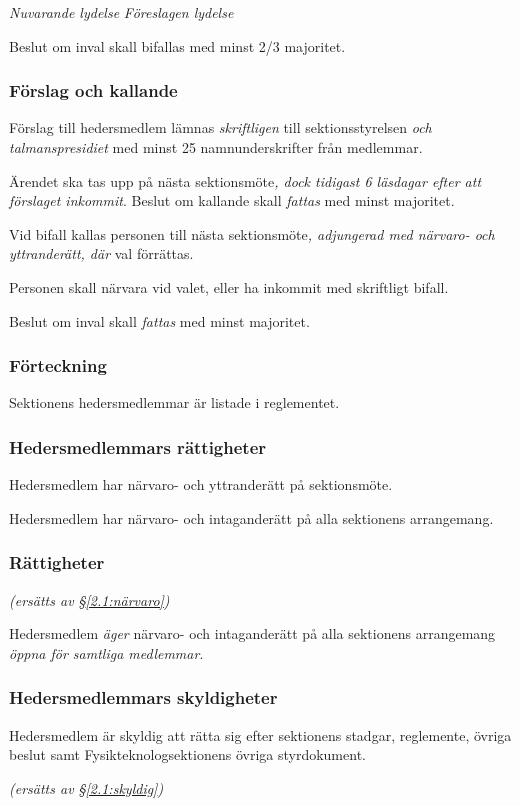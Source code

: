 \documentclass{article}
\newenvironment{lydelse}
    {\begin{paracol}{2}%
        \emph{Nuvarande lydelse}%
        \switchcolumn%
        \emph{Föreslagen lydelse}%
    \end{paracol}%
    \begin{enumerate}[label=\thesubsection.\arabic*]%
    \begin{paracol}{2}%
    }{\end{paracol}\end{enumerate}}
\newcommand{\itemb}{\item[\textbullet]}
\begin{document}
\begin{lydelse}
    \itemb Beslut om inval skall bifallas med minst 2/3 majoritet.
    
\switchcolumn
    \subsubsection*{Förslag och kallande}%
    
    \item Förslag till hedersmedlem lämnas \emph{skriftligen} till sektionsstyrelsen \emph{och talmanspresidiet} med minst 25 namnunderskrifter från medlemmar.

    \item Ärendet ska tas upp på nästa sektionsmöte\emph{, dock tidigast 6 läsdagar efter att förslaget inkommit}.
        Beslut om kallande skall \emph{fattas} med minst  majoritet.
    
    \item Vid bifall kallas personen till nästa sektionsmöte\emph{, adjungerad med närvaro- och yttranderätt, där} val förrättas.

    \item Personen skall närvara vid valet, eller ha inkommit med skriftligt bifall.

    \item Beslut om inval skall \emph{fattas} med minst  majoritet.
    
\switchcolumn*
    \subsubsection*{Förteckning}%
    \itemb Sektionens hedersmedlemmar är listade i reglementet.
    
\switchcolumn
\switchcolumn*
    \subsubsection*{Hedersmedlemmars rättigheter}%
    \itemb Hedersmedlem har närvaro- och yttranderätt på sektionsmöte.
    
    \itemb Hedersmedlem har närvaro- och intaganderätt på alla sektionens
arrangemang.
    
\switchcolumn
    \subsubsection*{Rättigheter}%
    \emph{(ersätts av \S \ref{2.1:närvaro})}
    
    \item Hedersmedlem \emph{äger} närvaro- och intaganderätt på alla sektionens
arrangemang \emph{öppna för samtliga medlemmar}.

\switchcolumn*
    \subsubsection*{Hedersmedlemmars skyldigheter}%
    \itemb Hedersmedlem är skyldig att rätta sig efter sektionens stadgar,
  regle\-mente, övriga beslut samt  Fysikteknologsektionens övriga styrdokument.
    
\switchcolumn
    \emph{(ersätts av \S \ref{2.1:skyldig})}
\end{lydelse}
\end{document}
